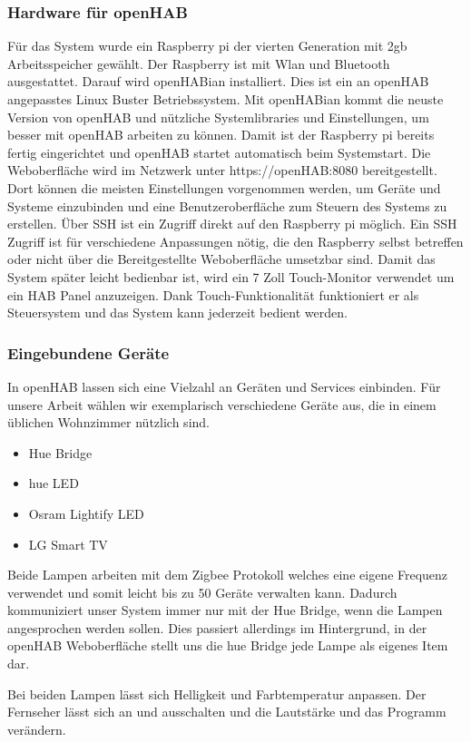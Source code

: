 	\subsubsection{Hardware für openHAB}
		Für das System wurde ein Raspberry pi der vierten Generation mit 2gb Arbeitsspeicher gewählt. Der Raspberry ist mit Wlan und Bluetooth ausgestattet. Darauf wird openHABian installiert. Dies ist ein an openHAB angepasstes Linux Buster Betriebssystem. Mit openHABian kommt die neuste Version von openHAB und nützliche Systemlibraries und Einstellungen, um besser mit openHAB arbeiten zu können. Damit ist der Raspberry pi bereits fertig eingerichtet und openHAB startet automatisch beim Systemstart. Die Weboberfläche wird im Netzwerk unter https://openHAB:8080 bereitgestellt. Dort können die meisten Einstellungen vorgenommen werden, um Geräte und Systeme einzubinden und eine Benutzeroberfläche zum Steuern des Systems zu erstellen. Über SSH ist ein Zugriff direkt auf den Raspberry pi möglich. Ein SSH Zugriff ist für verschiedene Anpassungen nötig, die den Raspberry selbst betreffen oder nicht über die Bereitgestellte Weboberfläche umsetzbar sind.
		Damit das System später leicht bedienbar ist, wird ein 7 Zoll Touch-Monitor verwendet um ein HAB Panel anzuzeigen. Dank Touch-Funktionalität funktioniert er als Steuersystem und das System kann jederzeit bedient werden.
		
	\subsubsection{Eingebundene Geräte}
		In openHAB lassen sich eine Vielzahl an Geräten und Services einbinden. Für unsere Arbeit wählen wir exemplarisch verschiedene Geräte aus, die in einem üblichen Wohnzimmer nützlich sind.
		\begin{itemize}
			\item Hue Bridge
			\item  hue LED
			\item Osram Lightify LED
			\item LG Smart TV
		\end{itemize}
		Beide Lampen arbeiten mit dem Zigbee Protokoll welches eine eigene Frequenz verwendet und somit leicht bis zu 50 Geräte verwalten kann. Dadurch kommuniziert unser System immer nur mit der Hue Bridge, wenn die Lampen angesprochen werden sollen. Dies passiert allerdings im Hintergrund, in der openHAB Weboberfläche stellt uns die hue Bridge jede Lampe als eigenes Item dar.
		
		Bei beiden Lampen lässt sich Helligkeit und Farbtemperatur anpassen. Der Fernseher lässt sich an und ausschalten und die Lautstärke und das Programm verändern.
		
